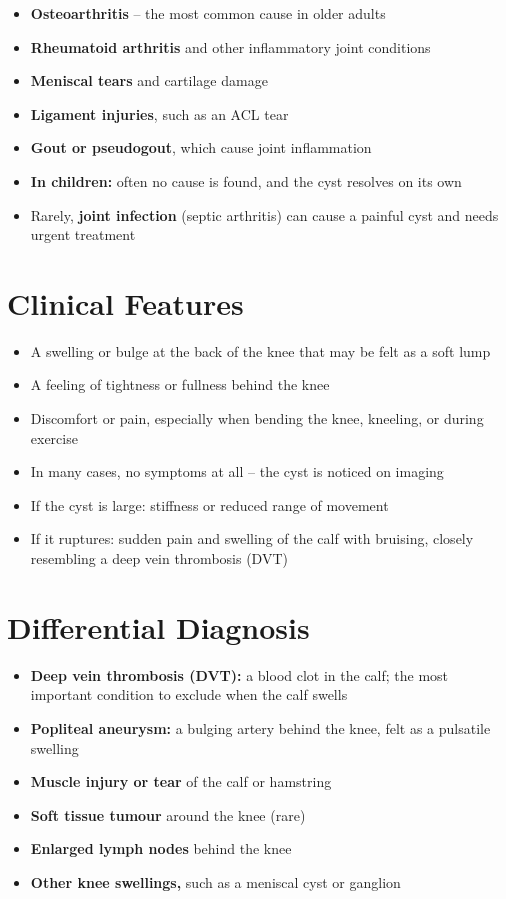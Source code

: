 \begin{itemize}
    \item \textbf{Osteoarthritis} -- the most common cause in older adults
    \item \textbf{Rheumatoid arthritis} and other inflammatory joint conditions
    \item \textbf{Meniscal tears} and cartilage damage
    \item \textbf{Ligament injuries}, such as an ACL tear
    \item \textbf{Gout or pseudogout}, which cause joint inflammation
    \item \textbf{In children:} often no cause is found, and the cyst resolves on its own
    \item Rarely, \textbf{joint infection} (septic arthritis) can cause a painful cyst and needs urgent treatment
\end{itemize}

\section*{Clinical Features}
\begin{itemize}
    \item A swelling or bulge at the back of the knee that may be felt as a soft lump
    \item A feeling of tightness or fullness behind the knee
    \item Discomfort or pain, especially when bending the knee, kneeling, or during exercise
    \item In many cases, no symptoms at all -- the cyst is noticed on imaging
    \item If the cyst is large: stiffness or reduced range of movement
    \item If it ruptures: sudden pain and swelling of the calf with bruising, closely resembling a deep vein thrombosis (DVT)
\end{itemize}

\section*{Differential Diagnosis}
\begin{itemize}
    \item \textbf{Deep vein thrombosis (DVT):} a blood clot in the calf; the most important condition to exclude when the calf swells
    \item \textbf{Popliteal aneurysm:} a bulging artery behind the knee, felt as a pulsatile swelling
    \item \textbf{Muscle injury or tear} of the calf or hamstring
    \item \textbf{Soft tissue tumour} around the knee (rare)
    \item \textbf{Enlarged lymph nodes} behind the knee
    \item \textbf{Other knee swellings,} such as a meniscal cyst or ganglion
\end{itemize}

